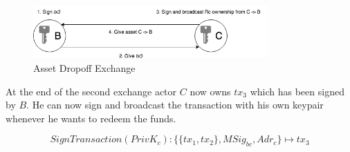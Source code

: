 \begin{figure}[h]
\centering
\includegraphics[width=0.8\textwidth]{images/exchange_02.png}
\caption{Asset Dropoff Exchange}
\label{fig:3 dropoff exchange}
\end{figure}

At the end of the second exchange actor $C$ now owns $tx_3$ which has been signed by $B$. He can now sign and broadcast the transaction with his own keypair whenever he wants to redeem the funds.

\[SignTransaction(PrivK_c)\colon\{\{tx_1, tx_2\}, MSig_{bc}, Adr_c\}\mapsto tx_3\]
